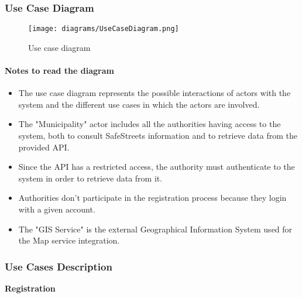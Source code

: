 \subsubsection{Use Case Diagram}
	\begin{figure}[h!]
		\centering
		\texttt{[image: diagrams/UseCaseDiagram.png]}
		\caption{
			\label{fig:useCase} 
				Use case diagram
		}
	\end{figure}
	
	\paragraph{Notes to read the diagram}
	\begin{itemize}
		\item The use case diagram represents the possible interactions of actors with the system and the different use cases in which the actors are involved.

		\item The "Municipality" actor includes all the authorities having access to the system, both to consult SafeStreets information and to retrieve data from the provided API.
		
		\item Since the API has a restricted access, the authority must authenticate to the system in order to retrieve data from it.
		
		\item Authorities don't participate in the registration process because they login with a given account.
		
		\item The "GIS Service" is the external Geographical Information System used for the Map service integration.
	\end{itemize}
		

\clearpage

\subsubsection{Use Cases Description}

\textbf{Registration}

